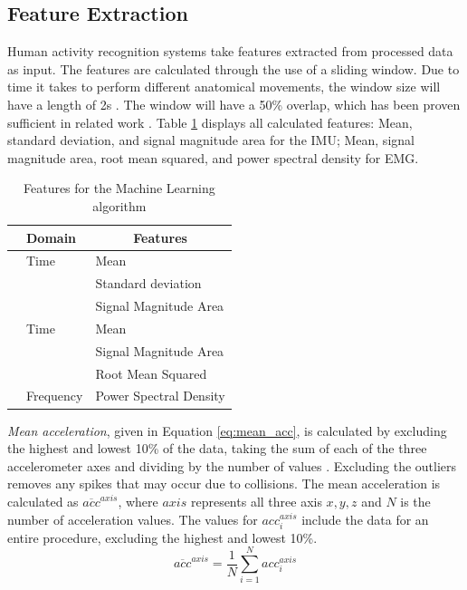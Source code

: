 \subsection{Feature Extraction}
\label{sec:Approach:Feature-Extraction}
Human activity recognition systems take features extracted from processed data as input. The features are calculated through the use of a sliding window. Due to time it takes to perform different anatomical movements, the window size will have a length of 2s \cite{Dorfmeister2014}. The window will have a 50\% overlap, which has been proven sufficient in related work \cite{Wannenburg2016}. Table \ref{tab:features} displays all calculated features: Mean, standard deviation, and signal magnitude area for the IMU; Mean, signal magnitude area, root mean squared, and power spectral density for EMG.
\begin{table}[h]
	\centering
	\begin{tabular}{c|l|l}
		& \multicolumn{1}{l|}{Domain} & \multicolumn{1}{c}{Features} \\
		\hline
		\parbox[t]{2mm}{} & Time & Mean\\
		&& Standard deviation\\
		&& Signal Magnitude Area\\
		\hline
		\parbox[t]{2mm}{} & Time & Mean\\
		&& Signal Magnitude Area \\
		&& Root Mean Squared \\
		& Frequency & Power Spectral Density \\
	\end{tabular}
	\caption{Features for the Machine Learning algorithm}
	\label{tab:features}
\end{table}
\emph{Mean acceleration}, given in Equation \ref{eq:mean_acc}, is calculated by excluding the highest and lowest 10\% of the data, taking the sum of each of the three accelerometer axes and dividing by the number of values \cite{Totty2017}. Excluding the outliers removes any spikes that may occur due to collisions. The mean acceleration is calculated as $ \overline{acc}^{axis} $, where $axis$ represents all three axis $x,y,z$ and $N$ is the number of acceleration values. The values for $acc^{axis}_i$ include the data for an entire procedure, excluding the highest and lowest 10\%.
\begin{equation}\label{eq:mean_acc}
\overline{acc}^{axis} = \frac{1}{N}\sum_{i=1}^{N}acc^{axis}_i
\end{equation}
